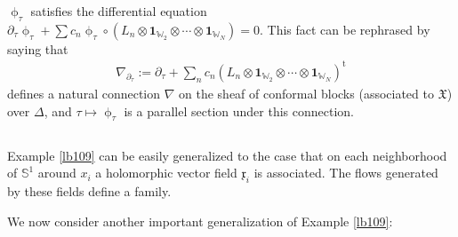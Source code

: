 \documentclass[11pt,b5paper,notitlepage]{article}
\theoremstyle{definition}
\theoremstyle{plain}
\newcommand{\fk}{\mathfrak}
\newcommand{\tr}{\mathrm{t}} %
\newcommand{\id}{\mathbf{1}}
\newcommand{\xk}{\mathfrak x}
\newcommand{\Wbb}{\mathbb W}
\newcommand{\Sbb}{{\mathbb S}}
\numberwithin{equation}{section}
\begin{document}
$\upphi_\tau$ satisfies the differential equation $\partial_\tau\upphi_\tau+\sum c_n\upphi_\tau\circ(L_n\otimes\id_{\Wbb_2}\otimes\cdots\otimes \id_{\Wbb_N})=0$. This fact can be rephrased by saying that
\begin{align}
\nabla_{\partial_\tau}:=\partial_\tau+\sum_n c_n (L_n\otimes\id_{\Wbb_2}\otimes\cdots\otimes \id_{\Wbb_N})^\tr
\end{align}
defines a natural connection $\nabla$  on the sheaf of conformal blocks (associated to $\fk X$) over $\Delta$, and $\tau\mapsto\upphi_\tau$ is a parallel section under this connection.




\subsection{}

Example \ref{lb109} can be easily generalized to the case that on each neighborhood of $\Sbb^1$ around $x_i$ a holomorphic vector field $\xk_i$ is associated. The flows generated by these fields define a family.

We now consider another important generalization of Example \ref{lb109}:
\end{document}
